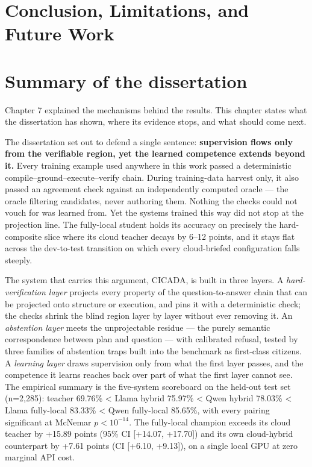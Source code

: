 \section{Conclusion, Limitations, and Future Work}\label{sec:chapter-8-conclusion-limitations-and-fut}

\section{Summary of the dissertation}\label{sec:summary-of-the-dissertation}

Chapter 7 explained the mechanisms behind the results. This chapter states what the dissertation has shown, where its evidence stops, and what should come next.

The dissertation set out to defend a single sentence: \textbf{supervision flows only from the verifiable region, yet the learned competence extends beyond it.} Every training example used anywhere in this work passed a deterministic compile--ground--execute--verify chain. During training-data harvest only, it also passed an agreement check against an independently computed oracle --- the oracle filtering candidates, never authoring them. Nothing the checks could not vouch for was learned from. Yet the systems trained this way did not stop at the projection line. The fully-local student holds its accuracy on precisely the hard-composite slice where its cloud teacher decays by 6--12 points, and it stays flat across the dev-to-test transition on which every cloud-briefed configuration falls steeply.

The system that carries this argument, CICADA, is built in three layers. A \emph{hard-verification layer} projects every property of the question-to-answer chain that can be projected onto structure or execution, and pins it with a deterministic check; the checks shrink the blind region layer by layer without ever removing it. An \emph{abstention layer} meets the unprojectable residue --- the purely semantic correspondence between plan and question --- with calibrated refusal, tested by three families of abstention traps built into the benchmark as first-class citizens. A \emph{learning layer} draws supervision only from what the first layer passes, and the competence it learns reaches back over part of what the first layer cannot see. The empirical summary is the five-system scoreboard on the held-out test set (n=2,285): teacher 69.76\% < Llama hybrid 75.97\% < Qwen hybrid 78.03\% < Llama fully-local 83.33\% < Qwen fully-local 85.65\%, with every pairing significant at McNemar $p<10^{-14}$. The fully-local champion exceeds its cloud teacher by +15.89 points (95\% CI [+14.07, +17.70]) and its own cloud-hybrid counterpart by +7.61 points (CI [+6.10, +9.13]), on a single local GPU at zero marginal API cost.

